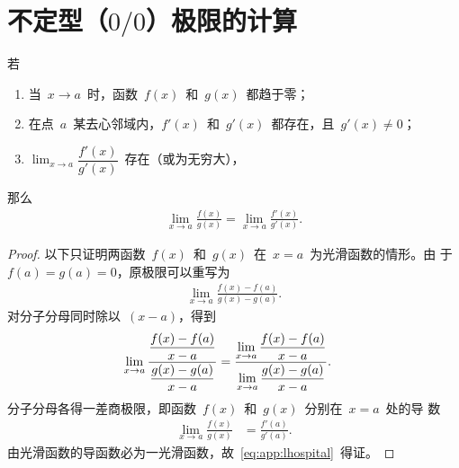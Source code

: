 \chapter{不定型（$0/0$）极限的计算}
\begin{theorem}[L'Hospital法则]
  若
  \begin{enumerate}
  \item 当~$x \to a$~时，函数~$f(x)$~和~$g(x)$~都趋于零；
  \item 在点~$a$~某去心邻域内，$f'(x)$~和~$g'(x)$~都存在，且~$g'(x)
    \neq 0$；
  \item $\displaystyle\lim_{x \to a} \dfrac{f'(x)}{g'(x)}$~存在（或为无穷大），
  \end{enumerate}
  那么
  \begin{align}
    \label{eq:app:lhospital}
    \lim_{x \to a} \frac{f(x)}{g(x)} = \lim_{x \to a} \frac{f'(x)}{g'(x)}.
  \end{align}
\end{theorem}
\begin{proof}
  以下只证明两函数~$f(x)$~和~$g(x)$~在~$x = a$~为光滑函数的情形。由
  于~$f(a) = g(a) = 0$，原极限可以重写为
  \begin{align*}
    \lim_{x \to a} \frac{f(x) - f(a)}{g(x) - g(a)}.
  \end{align*}
  对分子分母同时除以~$(x - a)$，得到
  \begin{align*}
    \lim_{x \to a} \frac{%
      \dfrac{f(x) - f(a)}{x - a}
    }{%
      \dfrac{g(x) - g(a)}{x - a}
    } &
    = \frac{%
      \displaystyle\lim_{x \to a} \frac{f(x) - f(a)}{x - a}
    }{%
      \displaystyle\lim_{x \to a} \frac{g(x) - g(a)}{x - a}
    }.
  \end{align*}
  分子分母各得一差商极限，即函数~$f(x)$~和~$g(x)$~分别在~$x = a$~处的导
  数
  \begin{align*}
    \lim_{x \to a} \frac{f(x)}{g(x)} &
    = \frac{f'(a)}{g'(a)}.
  \end{align*}
  由光滑函数的导函数必为一光滑函数，故~\eqref{eq:app:lhospital}~得证。
\end{proof}

